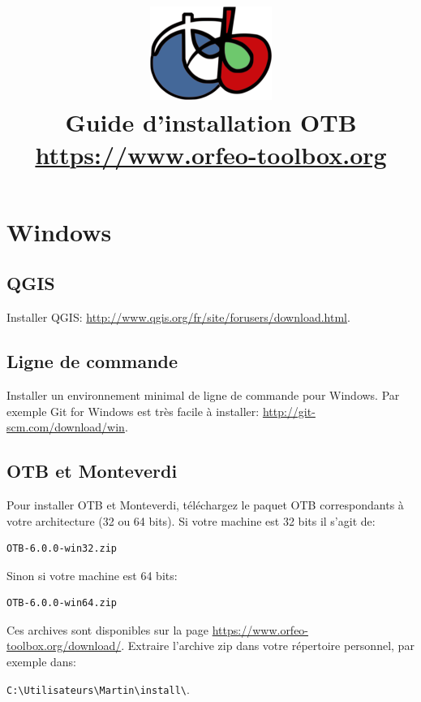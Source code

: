 \documentclass[10pt,a4paper]{article}
\title{\includegraphics[scale=1]{Art/otb-logo.png}\\
  Guide d'installation OTB\\
  {\small\url{https://www.orfeo-toolbox.org}}
}
\begin{document}
\maketitle

\tableofcontents

\clearpage
\section{Windows}

\subsection{QGIS}
Installer QGIS: \url{http://www.qgis.org/fr/site/forusers/download.html}.

\subsection{Ligne de commande}
Installer un environnement minimal de ligne de commande pour Windows. Par exemple
Git for Windows est très facile à installer:
\url{http://git-scm.com/download/win}.

\subsection{OTB et Monteverdi}
Pour installer OTB et Monteverdi, téléchargez le paquet OTB correspondants à
votre architecture (32 ou 64 bits). Si votre machine est 32
bits il s'agit de:

\begin{verbatim}
OTB-6.0.0-win32.zip
\end{verbatim}

Sinon si votre machine est 64 bits:

\begin{verbatim}
OTB-6.0.0-win64.zip
\end{verbatim}

Ces archives sont disponibles sur la page
\url{https://www.orfeo-toolbox.org/download/}.
Extraire l'archive zip dans votre répertoire personnel, par exemple dans:\\
\begin{centering}
\texttt{C:{\textbackslash}Utilisateurs{\textbackslash}Martin{\textbackslash}install{\textbackslash}}.
\end{centering}
\end{document}

